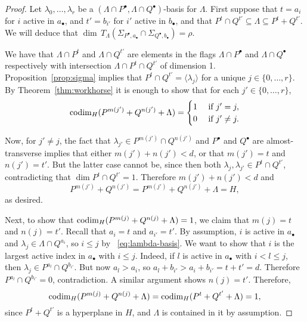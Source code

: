 \documentclass{amsart}
\begin{document}
\begin{proof}
Let $\lambda_0,\ldots,\lambda_r$ be a 
$(\Lambda\cap P^{\bullet},\Lambda\cap Q^{\bullet})$-basis for 
$\Lambda$.
First suppose that  $t=a_i$ for $i$ active in $a_{\bullet}$, and $t'=b_{i'}$ for $i'$ active in $b_{\bullet}$, and that $P^t\cap Q^{t'} \subseteq \Lambda \subseteq P^t + Q^{t'}.$  We will deduce that $\dim \, 
T_\Lambda (\Sigma_{P^{\bullet},a_{\bullet}} \cap \Sigma_{Q^{\bullet},b_{\bullet}})
=\rho.$   

We have that $\Lambda\cap P^t$ and $\Lambda\cap Q^{t'}$ are elements in the flags $\Lambda\cap P^\bullet$ and $\Lambda\cap Q^\bullet$ respectively with intersection $\Lambda\cap P^t \cap Q^{t'}$ of dimension 1.  Proposition~\ref{prop:sigma} implies that $P^t \cap Q^{t'} = \langle \lambda_j \rangle$ for a unique $j\in\{0,\ldots,r\}$.   By Theorem~\ref{thm:workhorse} it is enough to show that for each $j'\in\{0,\ldots,r\}$, $$\operatorname{codim}_H (P^{m(j')} + Q^{n(j')} + \Lambda) = \begin{cases}
1 &\text{ if }j'=j,\\
0&\text{ if }j'\ne j.
\end{cases}$$

Now, for $j'\ne j$, the fact that $\lambda_{j'}\in P^{m(j')}\cap Q^{n(j')}$ and $P^\bullet$ and $Q^\bullet$ are almost-transverse implies that either $m(j')+n(j')<d$, or that $m(j') = t$ and $n(j') = t'$.  But the latter case cannot be, since then both $\lambda_j, \lambda_{j'}\in P^{t}\cap Q^{t'}$, contradicting that $\dim P^{t}\cap Q^{t'}=1$.  Therefore $m(j')+n(j')<d$ and $$P^{m(j')}+ Q^{n(j')} = P^{m(j')}+ Q^{n(j')}+\Lambda = H,$$ as desired. 

Next, to show that $\operatorname{codim}_H (P^{m(j)} + Q^{n(j)}+\Lambda )=1$, we claim that $m(j) = t$ and $n(j) = t'$. Recall that $a_i = t$ and $a_{i'} =t'$. By assumption, $i$ is active in $a_{\bullet}$ and $\lambda_j\in\Lambda\cap Q^{a_i}$, so $i\le j$ by ~\eqref{eq:lambda-basis}.   We want to show that $i$ is the largest active index in $a_{\bullet}$ with $i\le j$.  Indeed, if $l$ is active in $a_{\bullet}$ with $i<l\le j$, then $\lambda_j\in P^{a_l}\cap Q^{b_{i'}}$.    But now $a_l > a_i$, so $a_l + b_{i'} > a_i + b_{i'} =  t+t'=d$.  Therefore $P^{a_l}\cap Q^{b_{i'}}=0$, contradiction. A similar argument shows $n(j) = t'$.  Therefore,
$$\operatorname{codim}_H (P^{m(j)} + Q^{n(j)} + \Lambda) = \operatorname{codim}_H (P^{t} + Q^{t'} + \Lambda)=1,$$
since $P^{t} + Q^{t'} $  is a hyperplane in $H$, and $\Lambda$ is contained in it by assumption.


\end{proof}
\end{document}
